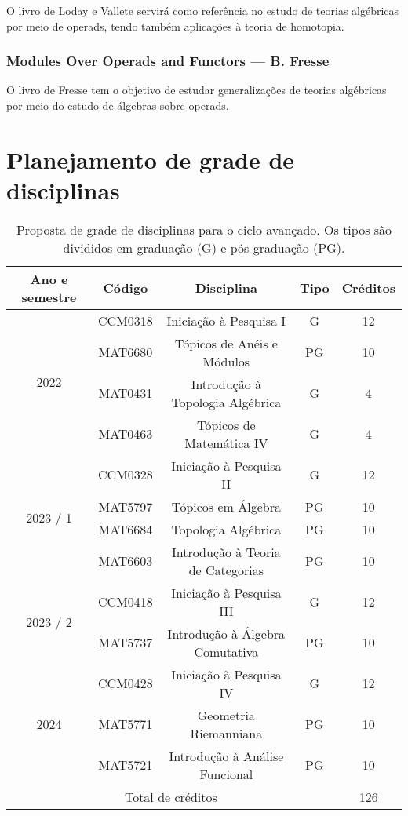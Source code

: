 \documentclass[11pt,reqno]{amsart}
\theoremstyle{definition}
\begin{document}
O livro de Loday e Vallete servirá como referência no estudo de teorias
algébricas por meio de operads, tendo também aplicações à teoria de homotopia.

\subsubsection{%
  \textbf{Modules Over Operads and Functors}
  --- B. Fresse~\cite{Fresse09}
}

O livro de Fresse tem o objetivo de estudar generalizações de teorias algébricas
por meio do estudo de álgebras sobre operads.

\appendix

\section{Planejamento de grade de disciplinas}\label{sec:disciplinas}

\begin{table}[h!]\label{tab:disc}
  \centering
  \caption{Proposta de grade de disciplinas para o ciclo avançado. Os tipos são
    divididos em graduação (G) e pós-graduação (PG).}
  \begin{tabular}{ |c|c|c|c|c| }
    \hline
    Ano e semestre & Código & Disciplina & Tipo & Créditos \\
    \hline

    \multirow{4}{*}{2022} & CCM0318 & Iniciação à Pesquisa I & G & 12 \\
                   & MAT6680 &Tópicos de Anéis e Módulos & PG & 10 \\
                   & MAT0431 & Introdução à Topologia Algébrica & G & 4 \\
                   & MAT0463 & Tópicos de Matemática IV & G & 4 \\
    \hline

    \multirow{4}{*}{2023 / 1} & CCM0328 & Iniciação à Pesquisa II & G & 12 \\
                   & MAT5797  & Tópicos em Álgebra & PG & 10 \\
                   & MAT6684 & Topologia Algébrica & PG & 10 \\
                   & MAT6603 & Introdução à Teoria de Categorias & PG & 10 \\
    \hline

    \multirow{2}{*}{2023 / 2} & CCM0418 & Iniciação à Pesquisa III & G & 12 \\
                   & MAT5737  & Introdução à Álgebra Comutativa & PG & 10 \\
    \hline

    \multirow{3}{*}{2024} & CCM0428 & Iniciação à Pesquisa IV & G & 12 \\
                   & MAT5771 & Geometria Riemanniana & PG & 10 \\
                   & MAT5721 & Introdução à Análise Funcional & PG & 10 \\
    \hline

    \multicolumn{4}{|c|}{Total de créditos} & 126 \\
    \hline
\end{tabular}
\end{table}
\end{document}
